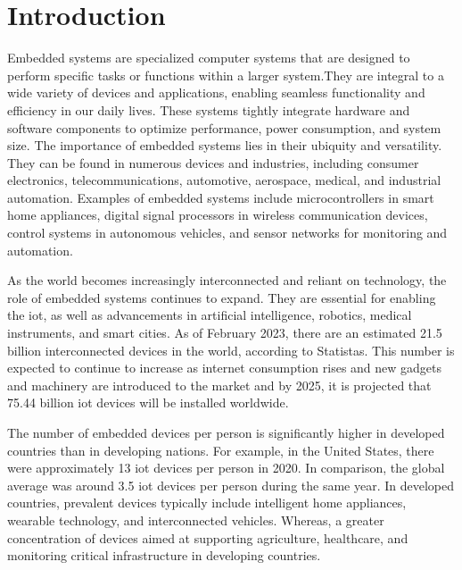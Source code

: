 
\chapter{Introduction}
\label{sec:sec_introduction}
Embedded systems are specialized computer systems that are designed to perform
specific tasks or functions within a larger system\cite{muench2018you}.They are
integral to a wide variety of devices and applications, enabling seamless
functionality and efficiency in our daily lives. These systems tightly
integrate hardware and software components to optimize performance, power
consumption, and system size\cite{eisele2022embedded}. The importance of
embedded systems lies in their ubiquity and versatility. They can be found in
numerous devices and industries, including consumer electronics\cite{andrae2010life},
telecommunications\cite{paulin1995dsp}, automotive\cite{Automoti68:online},
aerospace\cite{bieber2012security}, medical\cite{jafari2007medical}, and industrial
automation\cite{thramboulidis2007soa}. Examples of embedded systems include
microcontrollers\cite{gridling2007introduction} in smart home appliances\cite{kang2017enhanced},
digital signal processors in wireless communication devices\cite{kostic1997digital},
control systems in autonomous vehicles\cite{kostic1997digital}, and sensor
networks for monitoring and automation\cite{marwedel2021embedded}.

As the world becomes increasingly interconnected and reliant on technology,
the role of embedded systems continues to expand. They are essential for
enabling the \gls{iot}, as well as advancements in artificial intelligence,
robotics, medical instruments, and smart cities\cite{camposano1996embedded:ARTICLE}.
As of February 2023, there are an estimated 21.5 billion interconnected devices
in the world, according to Statistas\cite{IoTconne16:online}\cite{HowManyI1:online}.
This number is expected to continue to increase as internet consumption rises and
new gadgets and machinery are introduced to the market and by 2025,
it is projected that 75.44 billion \acrshort{iot} devices will be
installed worldwide\cite{HowManyI1:online}.

The number of embedded devices per person is significantly higher in developed
countries than in developing nations. For example, in the United States, there
were approximately 13 \acrshort{iot} devices per person in 2020\cite{Stateoft48:online}.
In comparison, the global average was around 3.5 \acrshort{iot} devices per person during
the same year\cite{CiscoAnn1:online}. In developed countries, prevalent devices
typically include intelligent home appliances\cite{wang2015anycontrol},
wearable technology\cite{poongodi2020wearable}, and
interconnected vehicles\cite{priyan2019survey}\cite{Internet36:online}.
Whereas, a greater concentration of devices aimed at supporting agriculture\cite{baranwal2016development},
healthcare\cite{pradhan2021iot}, and monitoring critical infrastructure in developing countries\cite{patil2012internet}.

